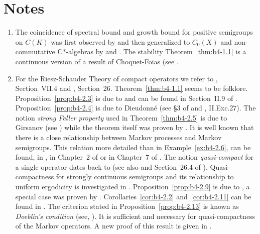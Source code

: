 \section*{Notes}
\begin{enumerate}[label=\emph{Section 4.\arabic*:}, wide, itemsep=1ex]

\item
 The coincidence of spectral bound and growth bound for positive semigroups on $C(K)$ was first observed by \textcite{derndinger:1980} and then generalized to $C_0(X)$ and non-commutative C*-algebras by \textcite{battydavies:1983} and \textcite{grohneubrander:1981}. 
The stability Theorem~\ref{thm:b4-1.1} is a continuous version of a result of Choquet-Foias (see 
\textcite[V.8.8]{schaefer:1974}.

\item
 For the Riesz-Schauder Theory of compact operators we refer to \textcite{dunfordschwartz:1958}, Section~VII.4 and \textcite{pietsch:1978}, Section~26. 
Theorem~\ref{thm:b4-1.1} seems to be folklore. Proposition~\ref{prop:b4-2.3} is due to \textcite{grothendieck:1953} and can be found in Section~II.9 of \textcite{schaefer:1974}. Proposition~\ref{prop:b4-2.4} is due to Dieudonné (see §3 of \textcite{grothendieck:1953} and \textcite{schaefer:1974}, II.Exc.27). The notion \emph{strong Feller property} used in Theorem~\ref{thm:b4-2.5} is due to Girsanov (see \textcite{dynkin:1965}) while the theorem itself was proven by \textcite{davies:1982}. 
It is well known that there is a close relationship between Markov processes and Markov semigroups. 
This relation more detailed than in Example~\ref{ex:b4-2.6}, can be found, \eg in \textcite{dynkin:1965}, in Chapter~2 of \textcite{vancasteren:1985} or in Chapter~7 of \textcite{lamperti:1977}. 
The notion \emph{quasi-compact} for a single operator dates back to \textcite{eberlein:1948} (see also \textcite{yosidakakutani:1941} and Section~26.4 of \textcite{pietsch:1978}). 
Quasi-compactness for strongly continuous semigroups and its relationship to uniform ergodicity is investigated in \textcite{lin:1975}. 
Proposition~\ref{prop:b4-2.9} is due to \textcite{voigt:1980}, a special case was proven by \textcite{vidav:1970}. 
Corollaries~\ref{cor:b4-2.2} and~\ref{cor:b4-2.11} can be found in   \textcite{greiner:1984}.
The criterion stated in Proposition~\ref{prop:b4-2.13} is known as \emph{Doeblin's condition} (see, \eg \textcite{yosidakakutani:1941}). It is sufficient and
necessary for quasi-compactness of the Markov operators. 
A new proof of this result is given in \textcite{lotz:1981}.


\end{enumerate}
